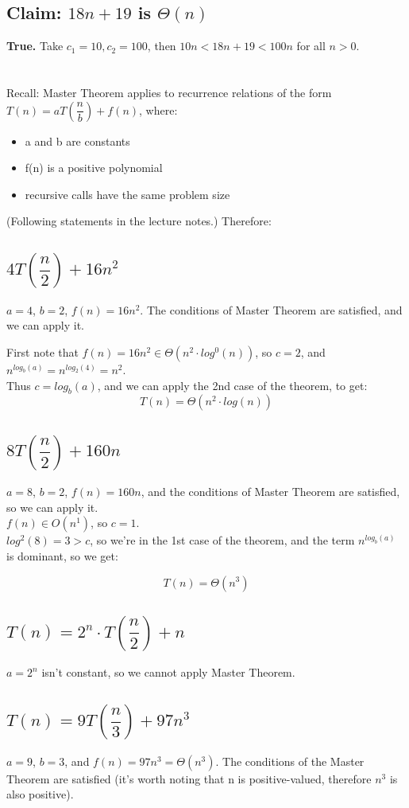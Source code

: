 \documentclass[tikz]{article}
\begin{document}
\subsection{Claim: $18n + 19$ is $\Theta(n)$}
\textbf{True.} Take $c_1 = 10, c_2 = 100$, then $10n<18n+19<100n$ for all $n>0$.

\section{}
Recall: Master Theorem applies to recurrence relations of the form $T(n) =  aT(\dfrac{n}{b}) + f(n)$, where:
\begin{itemize}
	\item a and b are constants
	\item f(n) is a positive polynomial
	\item recursive calls have the same problem size
\end{itemize}
(Following statements in the lecture notes.) Therefore:
\subsection{$4T(\dfrac{n}{2})+16n^2$}
$a = 4$, $b=2$, $f(n) = 16n^2$. The conditions of Master Theorem are satisfied, and we can apply it. 

First note that $f(n) = 16n^2 \in \Theta(n^2 \cdot log^0(n))$, so $c = 2$, and $n^{log_b(a)} = n^{log_2(4)} = n^2$. \\
Thus $c = log_b(a)$, and we can apply the 2nd case of the theorem, to get:
\[ T(n) = \Theta(n^2 \cdot log(n)) \]
\subsection{$8T(\dfrac{n}{2}) + 160n$}
$a = 8$, $b = 2$, $f(n) = 160n$, and the conditions of Master Theorem are satisfied, so we can apply it.\\
$f(n) \in O(n^1)$, so $c = 1$. \\
$log^2(8) = 3 > c$, so we're in the 1st case of the theorem, and the term $n^{log_b(a)}$ is dominant, so we get:

\[T(n) = \Theta(n^3)\]

\subsection{$T(n) = 2^n \cdot T(\dfrac{n}{2}) + n$}
$a = 2^n$ isn't constant, so we cannot apply Master Theorem.

\subsection{$T(n) = 9T(\dfrac{n}{3}) +97n^3$}
$a = 9$, $b=3$, and $f(n) = 97n^3 = \Theta(n^3)$. The conditions of the Master Theorem are satisfied (it's worth noting that n is positive-valued, therefore $n^3$ is also positive).
\end{document}
